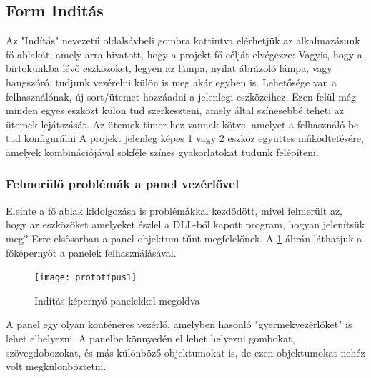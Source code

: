 \documentclass[tocnopagenum]{thesis-ekf}
\theoremstyle{definition}
\theoremstyle{remark}
\begin{document}
	\subsection{Form Inditás}
	\label{FormInditas}
	Az "Indítás" nevezetű oldalsávbeli gombra kattintva elérhetjük az alkalmazásunk fő ablakát, amely arra hivatott, hogy a projekt fő célját elvégezze: Vagyis, hogy a birtokunkba lévő eszközöket, legyen az lámpa, nyilat ábrázoló lámpa, vagy hangszóró, tudjunk vezérelni külön is meg akár egyben is.
	Lehetősége van a felhasználónak, új sort/ütemet hozzáadni a jelenlegi eszközeihez. Ezen felül még minden egyes eszközt külön tud szerkeszteni, amely által színesebbé teheti az ütemek lejátszását.
	Az ütemek timer-hez vannak kötve, amelyet a felhasználó be tud konfigurálni
	A projekt jelenleg képes 1 vagy 2 eszköz együttes működtetésére, amelyek kombinációjával sokféle színes gyakorlatokat tudunk felépíteni.
	\\
	\subsubsection{Felmerülő problémák a panel vezérlővel}
	Eleinte a fő ablak kidolgozása is problémákkal kezdődött, mivel felmerült az, hogy az eszközöket amelyeket észlel a DLL-ből kapott program, hogyan jelenítsük meg? Erre elsősorban a panel objektum tűnt megfelelőnek. A \ref{fig:prototipus1} ábrán láthatjuk a főképernyőt a panelek felhasználásával.
	\begin{figure}[H]	
		\centering
		\texttt{[image: prototípus1]}
		\caption[Indítás képernyő panelekkel megoldva]{Indítás képernyő panelekkel megoldva}
		\label{fig:prototipus1}
	\end{figure}
	A panel egy olyan konténeres vezérlő, amelyben hasonló "gyermekvezérlőket" is lehet elhelyezni. \cite{panelc}
	A panelbe könnyedén el lehet helyezni gombokat, szövegdobozokat, és más különböző objektumokat is, de ezen objektumokat nehéz volt megkülönböztetni. 
\end{document}
